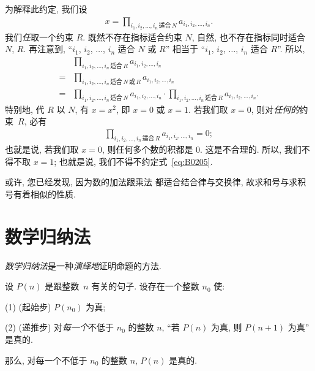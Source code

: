 为解释此约定, 我们设
\begin{align*}
    x = \prod_{i_1,i_2,\dots,i_n\,\text{适合}\,N}
    {a_{i_1, i_2, \dots, i_n}}.
\end{align*}
我们\emph{任}取一个约束 \(R\).
既然不存在指标适合约束 \(N\),
自然, 也不存在指标同时适合 \(N\), \(R\).
再注意到,
``\(i_1\), \(i_2\), \(\dots\), \(i_n\)
适合 \(N\) 或 \(R\)''
相当于
``\(i_1\), \(i_2\), \(\dots\), \(i_n\)
适合 \(R\)''.
所以,
\begin{align*}
         &
    \prod_{i_1,i_2,\dots,i_n\,\text{适合}\,R}
    {a_{i_1, i_2, \dots, i_n}}
    \\
    = {} &
    \prod_{i_1,i_2,\dots,i_n\,\text{适合}\,N\,\text{或}\,R}
    {a_{i_1, i_2, \dots, i_n}}
    \\
    = {} &
    \prod_{i_1,i_2,\dots,i_n\,\text{适合}\,N}
    {a_{i_1, i_2, \dots, i_n}}
    \cdot \prod_{i_1,i_2,\dots,i_n\,\text{适合}\,R}
    {a_{i_1, i_2, \dots, i_n}}.
\end{align*}
特别地, 代 \(R\) 以 \(N\), 有 \(x = x^2\),
即 \(x = 0\) 或 \(x = 1\).
若我们取 \(x = 0\),
则对\emph{任何的}约束~\(R\),
必有
\begin{align*}
    \prod_{i_1,i_2,\dots,i_n\,\text{适合}\,R}
    {a_{i_1, i_2, \dots, i_n}} = 0;
\end{align*}
也就是说, 若我们取 \(x = 0\),
则任何多个数的积都是 \(0\).
这是不合理的.
所以, 我们不得不取 \(x = 1\);
也就是说, 我们不得不约定式~\eqref{eq:B0205}.


\vspace{2ex}

或许, 您已经发现, 因为数的加法跟乘法%
都适合结合律与交换律,
故求和号与求积号有着相似的性质.

\section{数学归纳法}

\emph{数学归纳法}是一种\emph{演绎地}证明命题的方法.

\begin{theorem}[数学归纳法]
    设 \(P(n)\) 是跟整数~\(n\) 有关的句子.
    设存在一个整数 \(n_0\) 使:

    (1)
    (起始步)
    \(P(n_0)\) 为真;

    (2)
    (递推步)
    对\emph{每一个}不低于 \(n_0\) 的整数 \(n\),
    ``若 \(P(n)\) 为真, 则 \(P(n+1)\) 为真''
    是真的.

    那么, 对每一个不低于 \(n_0\) 的整数 \(n\),
    \(P(n)\) 是真的.
\end{theorem}

